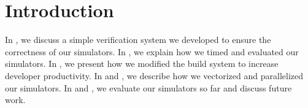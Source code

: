 \section{Introduction}\label{sec:intro}

In , we discuss a simple verification system we developed
to ensure the correctness of our simulators. In , we explain
how we timed and evaluated our simulators. In , we present how
we modified the build system to increase developer productivity. In
 and , we describe how we
vectorized and parallelized our simulators. In  and
, we evaluate our simulators so far and discuss future work.
